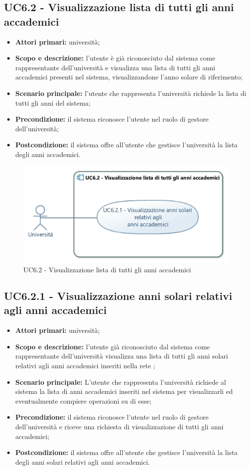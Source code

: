\documentclass[AnalisiDeiRequisiti.tex]{subfiles}
\begin{document}
\subsection{UC6.2 - Visualizzazione lista di tutti gli anni accademici}
\begin{itemize}
	\item \textbf{Attori primari:} università;
	\item \textbf{Scopo e descrizione:} l'utente è già riconosciuto dal sistema come rappresentante dell'università e visualizza una lista di tutti gli anni accademici presenti nel sistema, visualizzandone l'anno solare di riferimento;
	\item \textbf{Scenario principale:} l'utente che rappresenta l'università richiede la lista di tutti gli anni del sistema;
	\item \textbf{Precondizione:} il sistema riconosce l'utente nel ruolo di gestore dell'università;
	\item \textbf{Postcondizione:} il sistema offre all'utente che gestisce l'università la lista degli anni accademici.
\end{itemize}
\begin{figure}[H]
	\centering
	\includegraphics[width=0.7\linewidth]{UC6_2.jpg}
	\caption{UC6.2 - Visualizzazione lista di tutti gli anni accademici}
	\label{fig:UC6.2 - Visualizzazione lista di tutti gli anni accademici}
\end{figure}
\subsection{UC6.2.1 - Visualizzazione anni solari relativi agli anni accademici}
\begin{itemize}
	\item \textbf{Attori primari:} università;
	\item \textbf{Scopo e descrizione:} l'utente già riconosciuto dal sistema come rappresentante dell'università visualizza una lista di tutti gli anni solari relativi agli anni accademici inseriti nella rete ;
	\item \textbf{Scenario principale:} L'utente che rappresenta l'università richiede al sistema la lista di anni accademici inseriti nel sistema per visualizzarli ed eventualmente compiere operazioni su di esse;
	\item \textbf{Precondizione:} il sistema riconosce l'utente nel ruolo di gestore dell'università e riceve una richiesta di visualizzazione di tutti gli anni accademici;
	\item \textbf{Postcondizione:} il sistema offre all'utente che gestisce l'università la lista degli anni solari relativi agli anni accademici.
\end{itemize}
\end{document}
